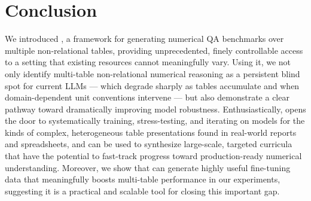 \section{Conclusion} 
We introduced \name, a framework for generating numerical QA benchmarks over multiple non-relational tables, providing unprecedented, finely controllable access to a setting that existing resources cannot meaningfully vary. Using it, we not only identify multi-table non-relational numerical reasoning as a persistent blind spot for current LLMs — which degrade sharply as tables accumulate and when domain-dependent unit conventions intervene — but also demonstrate a clear pathway toward dramatically improving model robustness. Enthusiastically, \name opens the door to systematically training, stress-testing, and iterating on models for the kinds of complex, heterogeneous table presentations found in real-world reports and spreadsheets, and can be used to synthesize large-scale, targeted curricula that have the potential to fast-track progress toward production-ready numerical understanding. Moreover, we show that \name can generate highly useful fine-tuning data that meaningfully boosts multi-table performance in our experiments, suggesting it is a practical and scalable tool for closing this important gap. 
